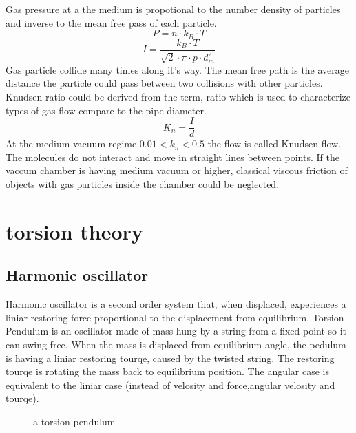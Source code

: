 \documentclass[\main/master.tex]{subfiles}
\begin{document}
Gas pressure at a the medium is  propotional to the number density of particles and inverse to the mean free pass of each particle.    
\begin{equation}
P = n\cdot k_B\cdot T  \label{eqn:ideal-gasses}
\end{equation}
\begin{equation}
I = \frac{k_B\cdot T}{\sqrt{2}\cdot\pi\cdot p\cdot d_m^2}     \label{eqn:mean-free-pass}
\end{equation}
Gas particle collide many times along it's way. The mean free path is the average distance the particle could pass between two collisions with other particles. Knudsen ratio could be derived from the term, ratio which is used to characterize types of gas flow compare to the pipe diameter.
\begin{equation}
K_n = \frac{I}{d}     \label{eqn:mean-free-pass}
\end{equation}
At the medium vacuum regime $0.01<k_n<0.5$ the flow is called Knudsen flow. The molecules do not interact and move in straight lines between points. If the vaccum chamber is having medium vacuum or higher, classical viscous friction of objects with gas particles inside the chamber could be neglected.



\section{torsion theory}
\subsection{Harmonic oscillator}
Harmonic oscillator is a second order system that, when displaced, experiences a liniar restoring force proportional to the displacement from equilibrium. Torsion Pendulum is an oscillator made of mass hung by a string from a fixed point so it can swing free. When the mass is displaced from equilibrium angle, the pedulum is having a liniar restoring tourqe, caused by the twisted string. The restoring tourqe is rotating the mass back to equilibrium position. The angular case is equivalent to the liniar case (instead of velosity and force,angular velosity and tourqe).
\par
\begin{figure}[htbp]
	\centering
	\caption[pendulum]{a torsion pendulum}
	\label{fig:torsion_pendulum}
\end{figure}
\end{document}

